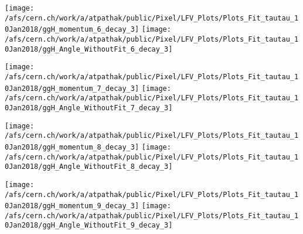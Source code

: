 \documentclass{beamer}
\begin{document}
\begin{frame}
\begin{normalsize}
\begin{center}
\texttt{[image: /afs/cern.ch/work/a/atpathak/public/Pixel/LFV\_Plots/Plots\_Fit\_tautau\_10Jan2018/ggH\_momentum\_6\_decay\_3]}
\texttt{[image: /afs/cern.ch/work/a/atpathak/public/Pixel/LFV\_Plots/Plots\_Fit\_tautau\_10Jan2018/ggH\_Angle\_WithoutFit\_6\_decay\_3]} 
\end{center}
\end{normalsize}
\end {frame}
\begin{frame}
\begin{normalsize}
\begin{center}
\texttt{[image: /afs/cern.ch/work/a/atpathak/public/Pixel/LFV\_Plots/Plots\_Fit\_tautau\_10Jan2018/ggH\_momentum\_7\_decay\_3]}
\texttt{[image: /afs/cern.ch/work/a/atpathak/public/Pixel/LFV\_Plots/Plots\_Fit\_tautau\_10Jan2018/ggH\_Angle\_WithoutFit\_7\_decay\_3]} 
\end{center}
\end{normalsize}
\end {frame}
\begin{frame}
\begin{normalsize}
\begin{center}
\texttt{[image: /afs/cern.ch/work/a/atpathak/public/Pixel/LFV\_Plots/Plots\_Fit\_tautau\_10Jan2018/ggH\_momentum\_8\_decay\_3]}
\texttt{[image: /afs/cern.ch/work/a/atpathak/public/Pixel/LFV\_Plots/Plots\_Fit\_tautau\_10Jan2018/ggH\_Angle\_WithoutFit\_8\_decay\_3]} 
\end{center}
\end{normalsize}
\end {frame}
\begin{frame}
\begin{normalsize}
\begin{center}
\texttt{[image: /afs/cern.ch/work/a/atpathak/public/Pixel/LFV\_Plots/Plots\_Fit\_tautau\_10Jan2018/ggH\_momentum\_9\_decay\_3]}
\texttt{[image: /afs/cern.ch/work/a/atpathak/public/Pixel/LFV\_Plots/Plots\_Fit\_tautau\_10Jan2018/ggH\_Angle\_WithoutFit\_9\_decay\_3]} 
\end{center}
\end{normalsize}
\end {frame}
\end{document}
